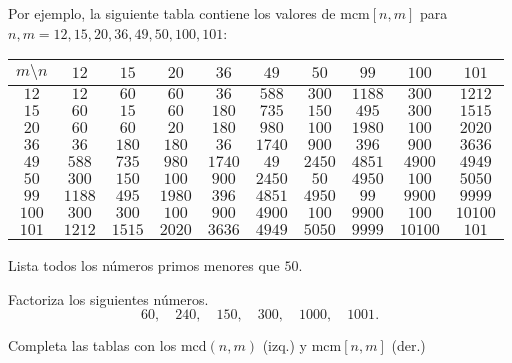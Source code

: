 Por ejemplo, la siguiente tabla contiene los valores de $\mathrm{mcm}[n,m]$ para $n,m= 12,15,20,36,49,50,100,101$:
\begin{center}
\begin{tabular}{|c||c|c|c|c|c|c|c|c|c|} 
 \hline
  $m\setminus n$& $12$ & $15$ & $20$ & $36$ & $49$ & $50$& $99$ & $100$ & $101$ \\ 
  \hline
  \hline
  $12$ & $12$ & $60$ & $60$ & $36$ & $588$ & $300$ & $1188$ & $300$ & $1212$ \\
  \hline
  $15$ & $60$ & $15$ & $60$ & $180$ & $735$ & $150$ & $495$ & $300$ & $1515$ \\
  \hline
  $20$ & $60$ & $60$ & $20$ & $180$ & $980$ & $100$ & $1980$ & $100$ & $2020$ \\
  \hline
  $36$ & $36$ & $180$ & $180$ & $36$ & $1740$ & $900$ & $396$ & $900$ & $3636$ \\ 
  \hline
  $49$ & $588$ & $735$ & $980$ & $1740$ & $49$ & $2450$ & $4851$ & $4900$ & $4949$ \\
  \hline
    $50$ & $300$ & $150$ & $100$ & $900$ & $2450$ & $50$ & $4950$ & $100$ & $5050$ \\
  \hline
    $99$ & $1188$ & $495$ & $1980$ & $396$ & $4851$ & $4950$ & $99$ & $9900$ & $9999$ \\
  \hline
    $100$ & $300$ & $300$ & $100$ & $900$ & $4900$ & $100$ & $9900$ & $100$ & $10100$ \\
  \hline
    $101$ & $1212$ & $1515$ & $2020$ & $3636$ & $4949$ & $5050$ & $9999$ & $10100$ & $101$ \\
  \hline
  \end{tabular}    
\end{center}

\begin{ejercicio}
Lista todos los números primos menores que $50$.
\end{ejercicio}

\begin{ejercicio}
Factoriza los siguientes números. 
$$60,\quad 240, \quad 150,  \quad 300, \quad  1000,\quad 1001.$$
\end{ejercicio}

\begin{ejercicio}
Completa las tablas con los $\mathrm{mcd}(n,m)$ (izq.) y $\mathrm{mcm}[n,m]$ (der.)
\end{ejercicio}

